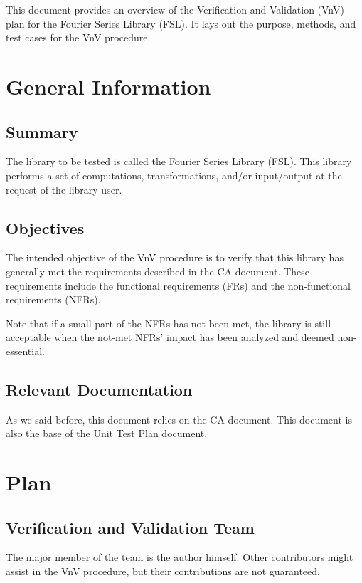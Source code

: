 \documentclass[12pt, titlepage]{article}
\begin{document}
This document provides an overview of the Verification and Validation (VnV) plan for the Fourier Series Library (FSL). It lays out the purpose, methods, and test cases for the VnV procedure. 

\section{General Information}

\subsection{Summary}

The library to be tested is called the Fourier Series Library (FSL). This library performs a set of computations, transformations, and/or input/output at the request of the library user.

\subsection{Objectives}

The intended objective of the VnV procedure is to verify that this library has generally met the requirements described in the CA document. These requirements include the functional requirements (FRs) and the non-functional requirements (NFRs).

Note that if a small part of the NFRs has not been met, the library is still acceptable when the not-met NFRs' impact has been analyzed and deemed non-essential.

\subsection{Relevant Documentation}

As we said before, this document relies on the CA document. This document is also the base of the Unit Test Plan document.


\section{Plan}
	
\subsection{Verification and Validation Team}

The major member of the team is the author himself. Other contributors might assist in the VnV procedure, but their contributions are not guaranteed.
\end{document}
